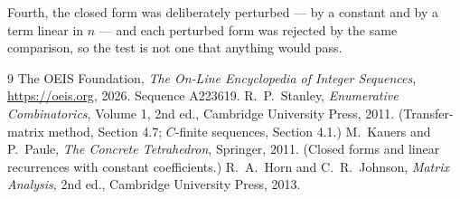\documentclass[11pt,a4paper]{article}
\theoremstyle{plain}
\theoremstyle{definition}
\begin{document}
Fourth, the closed form was deliberately perturbed --- by a constant and by a term linear in
$n$ --- and each perturbed form was rejected by the same comparison, so the test is not one
that anything would pass.

\begin{thebibliography}{9}
 The OEIS Foundation, \emph{The On-Line Encyclopedia of Integer
Sequences}, \url{https://oeis.org}, 2026. Sequence A223619.
 R.~P.~Stanley, \emph{Enumerative Combinatorics}, Volume 1, 2nd ed.,
Cambridge University Press, 2011. (Transfer-matrix method, Section 4.7; $C$-finite sequences,
Section 4.1.)
 M.~Kauers and P.~Paule, \emph{The Concrete Tetrahedron}, Springer, 2011.
(Closed forms and linear recurrences with constant coefficients.)
 R.~A.~Horn and C.~R.~Johnson, \emph{Matrix Analysis}, 2nd ed., Cambridge
University Press, 2013.
\end{thebibliography}
\end{document}
